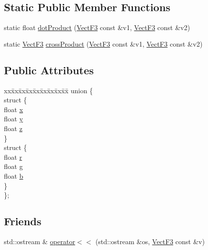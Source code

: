 \subsection*{Static Public Member Functions}
\begin{DoxyCompactItemize}
\item 
static float \hyperlink{classVectF3_a0baf086ff969abd4a0adad08929c64ed}{dot\-Product} (\hyperlink{classVectF3}{Vect\-F3} const \&v1, \hyperlink{classVectF3}{Vect\-F3} const \&v2)
\item 
static \hyperlink{classVectF3}{Vect\-F3} \hyperlink{classVectF3_a6713635c6cf4628e19bfaa0f3cb58174}{cross\-Product} (\hyperlink{classVectF3}{Vect\-F3} const \&v1, \hyperlink{classVectF3}{Vect\-F3} const \&v2)
\end{DoxyCompactItemize}
\subsection*{Public Attributes}
\begin{DoxyCompactItemize}
\item 
\begin{tabbing}
xx\=xx\=xx\=xx\=xx\=xx\=xx\=xx\=xx\=\kill
union \{\\
\>struct \{\\
\>\>float \hyperlink{classVectF3_a1ec0a761f0461ca38f1ca57cf095f6fa}{x}\\
\>\>float \hyperlink{classVectF3_a8331d1adee2ca04fdcd3f5fa4e133896}{y}\\
\>\>float \hyperlink{classVectF3_a6ada1ce72aa27f56e4b529a28c0789c4}{z}\\
\>\} \\
\>struct \{\\
\>\>float \hyperlink{classVectF3_ad6da306c6b16f3a84d2b96cb4824cdba}{r}\\
\>\>float \hyperlink{classVectF3_af80eb198426897da1d9f8b3b13429c8b}{g}\\
\>\>float \hyperlink{classVectF3_af17b78fdbc8a19c46a31144b41ff70d6}{b}\\
\>\} \\
\}; \\

\end{tabbing}\end{DoxyCompactItemize}
\subsection*{Friends}
\begin{DoxyCompactItemize}
\item 
std\-::ostream \& \hyperlink{classVectF3_abe8f33f83ce97153932977160f9a1bd3}{operator$<$$<$} (std\-::ostream \&os, \hyperlink{classVectF3}{Vect\-F3} const \&v)
\end{DoxyCompactItemize}


